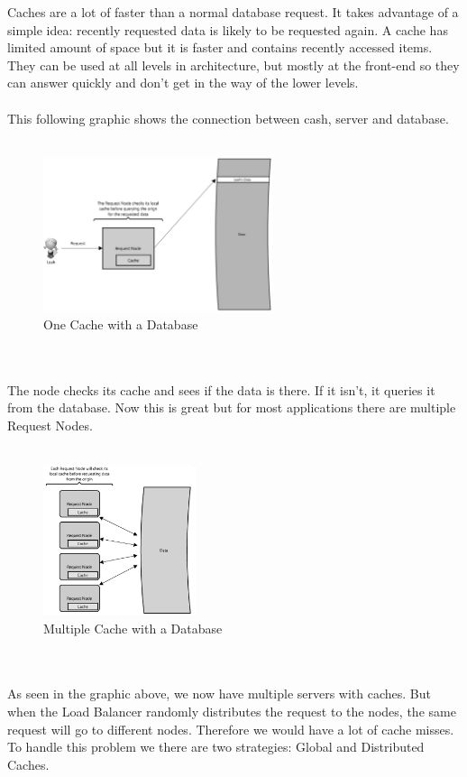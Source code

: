 \documentclass[12p]{article}
\begin{document}
	Caches are a lot of faster than a normal database request. It takes advantage of a simple idea: recently requested data is likely to be requested again. A cache has limited amount of space but it is faster and contains recently accessed items. They can be used at all levels in architecture, but mostly at the front-end so they can answer quickly and don't get in the way of the lower levels. \\\\
	This following graphic shows the connection between cash, server and database. \\\\
	\begin{figure}[h!]
		\centering
		\includegraphics[width=0.6\textwidth]{img/cache1}
		\caption{One Cache with a Database \cite{cache}}
	\end{figure}
	\\\\
	The node checks its cache and sees if the data is there. If it isn't, it queries it from the database. Now this is great but for most applications there are multiple Request Nodes. \\\\
	\begin{figure}[h!]
		\centering
		\includegraphics[width=0.4\textwidth]{img/cache2}
		\caption{Multiple Cache with a Database \cite{cache}}
	\end{figure}
	\\\\
	As seen in the graphic above, we now have multiple servers with caches. But when the Load Balancer randomly distributes the request to the nodes, the same request will go to different nodes. Therefore we would have a lot of cache misses. To handle this problem we there are two strategies: Global and Distributed Caches. 
	
\end{document}
